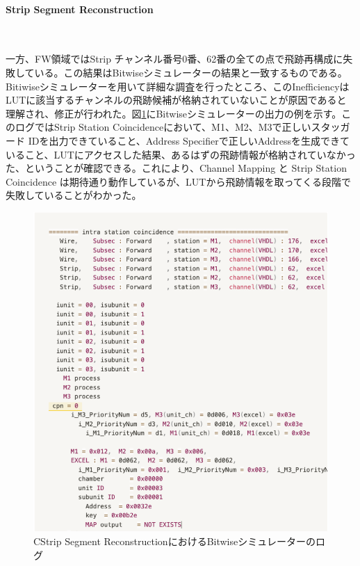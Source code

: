 \paragraph{Strip Segment Reconstruction}　　
\par
一方、FW領域ではStrip チャンネル番号0番、62番の全ての点で飛跡再構成に失敗している。この結果はBitwiseシミュレーターの結果と一致するものである。Bitiwiseシミュレーターを用いて詳細な調査を行ったところ、このInefficiencyはLUTに該当するチャンネルの飛跡候補が格納されていないことが原因であると理解され、修正が行われた。図\ref{Bitwise_example}にBitwiseシミュレーターの出力の例を示す。このログではStrip Station Coincidenceにおいて、M1、M2、M3で正しいスタッガード IDを出力できていること、Address Specifierで正しいAddressを生成できていること、LUTにアクセスした結果、あるはずの飛跡情報が格納されていなかった、ということが確認できる。これにより、Channel Mapping と Strip Station Coincidence は期待通り動作しているが、LUTから飛跡情報を取ってくる段階で失敗していることがわかった。

\begin{figure} 
  \centering
  \includegraphics[width=16cm]{fig/Test/Bitwise_example.png}
  \caption[Strip Segment ReconstructionにおけるBitwiseシミュレーターのログ]{CStrip Segment ReconstructionにおけるBitwiseシミュレーターのログ}
  \label{Bitwise_example}
\end{figure}


